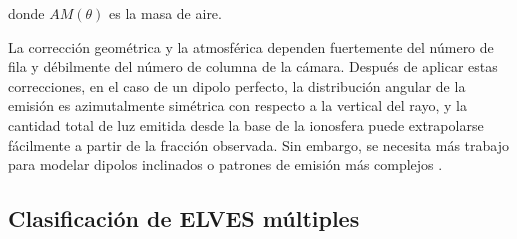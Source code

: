 \documentclass[12pt,oneside,openany,letter]{book}
\begin{document}
donde $AM(\theta)$ es la masa de aire. 

La corrección geométrica y la atmosférica dependen fuertemente del número de fila y débilmente del número de columna de la cámara. Después de aplicar estas correcciones, en el caso de un dipolo perfecto, la distribución angular de la emisión es azimutalmente simétrica con respecto a la vertical del rayo, y la cantidad total de luz emitida desde la base de la ionosfera puede extrapolarse fácilmente a partir de la fracción observada. Sin embargo, se necesita más trabajo para modelar dipolos inclinados o patrones de emisi\'on m\'as complejos \cite{Mussa2019}.


\subsection{Clasificación de ELVES múltiples}
\end{document}
